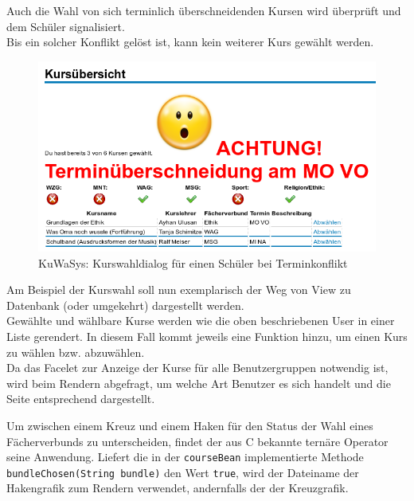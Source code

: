 Auch die Wahl von sich terminlich überschneidenden Kursen wird überprüft und dem Schüler signalisiert. \\Bis ein solcher Konflikt gelöst ist, kann kein weiterer Kurs gewählt werden. 
\begin{figure}[h]
 \begin{center}
   \includegraphics[scale=0.7]{img/kurswahl_konflikt_KuWaSys.png}
 \end{center}
 \caption[\textbf{KuWaSys: Kurswahldialog für einen Schüler bei Terminkonflikt}]{KuWaSys: Kurswahldialog für einen Schüler bei Terminkonflikt}
 \label{fig:kurswahl_konflikt_KuWaSys}
\end{figure}

Am Beispiel der Kurswahl soll nun exemplarisch der Weg von View zu Datenbank (oder umgekehrt) dargestellt werden.\\ 
Gewählte und wählbare Kurse werden wie die oben beschriebenen User in einer Liste gerendert. In diesem Fall kommt jeweils eine Funktion hinzu, um einen Kurs zu wählen bzw. abzuwählen. \\Da das Facelet zur Anzeige der Kurse für alle Benutzergruppen notwendig ist, wird beim Rendern abgefragt, um welche Art Benutzer es sich handelt und die Seite entsprechend dargestellt.

Um zwischen einem Kreuz und einem Haken für den Status der Wahl eines Fächerverbunds zu unterscheiden, findet der aus C bekannte ternäre Operator seine Anwendung. Liefert die in der \texttt{courseBean} implementierte Methode \texttt{bundleChosen(String bundle)} den Wert \texttt{true}, wird der Dateiname der Hakengrafik zum Rendern verwendet, andernfalls der der Kreuzgrafik.
	
	
